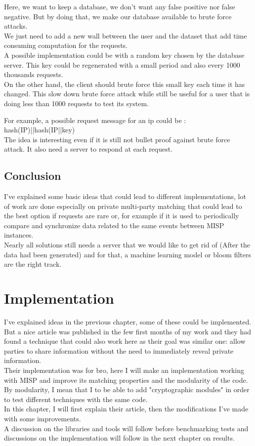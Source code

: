 \documentclass{eplmastersthesis}
\begin{document}
Here, we want to keep a database, we don't want any false positive nor false negative. But by doing that, we make our database available to brute force attacks.\\
We just need to add a new wall between the user and the dataset that add time consuming computation for the requests.\\

A possible implementation could be with a random key chosen by the database server. This key could be regenerated with a small period and also every 1000 thousands requests.\\
On the other hand, the client should brute force this small key each time it has changed. This slow down brute force attack while still be useful for a user that is doing less than 1000 requests to test its system.

For example, a possible request message for an ip could be : hash(IP)||hash(IP||key)\\

The idea is interesting even if it is still not bullet proof against brute force attack. It also need a server to respond at each request.

\section{Conclusion}
I've explained some basic ideas that could lead to different implementations, lot of work are done especially on private multi-party matching that could lead to the best option if requests are rare or, for example if it is used to periodically compare and synchronize data related to the same events between MISP instances.\\
Nearly all solutions still needs a server that we would like to get rid of (After the data had been generated) and for that, a machine learning model or bloom filters are the right track.






\chapter{Implementation}
I've explained ideas in the previous chapter, some of these could be implemented. But a nice article \cite{van2016private} was published in the few first months of my work and they had found a technique that could also work here as their goal was similar one: allow parties to share information without the need to immediately reveal private information.\\
Their implementation was for bro, here I will make an implementation working with MISP and improve its matching properties and the modularity of the code. \\
By modularity, I mean that I to be able to add "cryptographic modules" in order to test different techniques with the same code.\\
In this chapter, I will first explain their article, then the modifications I've made with some improvements.\\
A discussion on the libraries and tools will follow before benchmarking tests and discussions on the implementation will follow in the next chapter on results.
\end{document}
